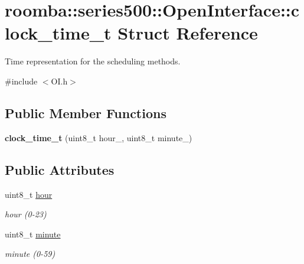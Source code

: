 \hypertarget{structroomba_1_1series500_1_1_open_interface_1_1clock__time__t}{\section{roomba\+:\+:series500\+:\+:Open\+Interface\+:\+:clock\+\_\+time\+\_\+t Struct Reference}
\label{structroomba_1_1series500_1_1_open_interface_1_1clock__time__t}
}


Time representation for the scheduling methods.  




{\ttfamily \#include $<$O\+I.\+h$>$}

\subsection*{Public Member Functions}
\begin{DoxyCompactItemize}
\item 
\hypertarget{structroomba_1_1series500_1_1_open_interface_1_1clock__time__t_a9f3cec7af14c01c427be9e0dc6ef4bc3}{{\bfseries clock\+\_\+time\+\_\+t} (uint8\+\_\+t hour\+\_, uint8\+\_\+t minute\+\_)}\label{structroomba_1_1series500_1_1_open_interface_1_1clock__time__t_a9f3cec7af14c01c427be9e0dc6ef4bc3}

\end{DoxyCompactItemize}
\subsection*{Public Attributes}
\begin{DoxyCompactItemize}
\item 
\hypertarget{structroomba_1_1series500_1_1_open_interface_1_1clock__time__t_a8a1ed2be811619067b2bdf6546a6390f}{uint8\+\_\+t \hyperlink{structroomba_1_1series500_1_1_open_interface_1_1clock__time__t_a8a1ed2be811619067b2bdf6546a6390f}{hour}}\label{structroomba_1_1series500_1_1_open_interface_1_1clock__time__t_a8a1ed2be811619067b2bdf6546a6390f}

\begin{DoxyCompactList}\small\item\em hour (0-\/23) \end{DoxyCompactList}\item 
\hypertarget{structroomba_1_1series500_1_1_open_interface_1_1clock__time__t_ae47611e06675adb773dd14d3e4e255ca}{uint8\+\_\+t \hyperlink{structroomba_1_1series500_1_1_open_interface_1_1clock__time__t_ae47611e06675adb773dd14d3e4e255ca}{minute}}\label{structroomba_1_1series500_1_1_open_interface_1_1clock__time__t_ae47611e06675adb773dd14d3e4e255ca}

\begin{DoxyCompactList}\small\item\em minute (0-\/59) \end{DoxyCompactList}\end{DoxyCompactItemize}



